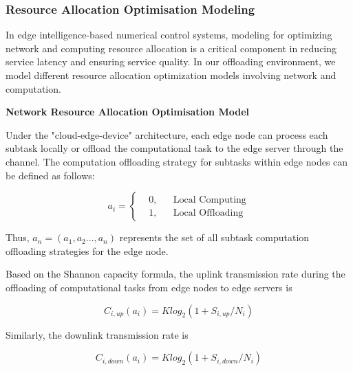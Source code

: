 \documentclass[preprint,12pt]{elsarticle}
\begin{document}
\subsubsection{Resource Allocation Optimisation Modeling}

In edge intelligence-based numerical control systems, modeling for optimizing network and computing resource allocation is a critical component in reducing service latency and ensuring service quality. In our offloading environment, we model different resource allocation optimization models involving network and computation.

\textbf{Network Resource Allocation Optimisation Model}

Under the "cloud-edge-device" architecture, each edge node can process each subtask locally or offload the computational task to the edge server through the channel. The computation offloading strategy for subtasks within edge nodes can be defined as follows:


\begin{equation}
a_i = \left\{
    \begin{aligned}
        &0, && \text{Local Computing} \\
        &1, && \text{Local Offloading}
    \end{aligned}
\right.
\end{equation}

Thus, \(a_n=(a_1,a_2...,a_n)\) represents the set of all subtask computation offloading strategies for the edge node.

Based on the Shannon capacity formula, the uplink transmission rate during the offloading of computational tasks from edge nodes to edge servers is

\begin{equation}
    C_{i,up}(a_i)=Klog_2(1+S_{i,up}/N_i)
\end{equation}

Similarly, the downlink transmission rate is

\begin{equation}
    C_{i,down}(a_i)=Klog_2(1+S_{i,down}/N_i)
\end{equation}
\end{document}
